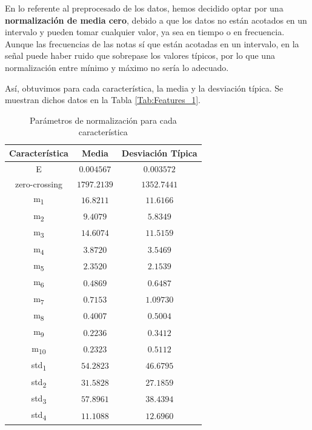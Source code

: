 \documentclass[12pt]{article}
\begin{document}
\bigskip
En lo referente al preprocesado de los datos, hemos decidido optar por una \textbf{normalización de media cero},
debido a que los datos no están acotados en un intervalo y pueden tomar cualquier valor, ya sea
en tiempo o en frecuencia.
Aunque las frecuencias de las notas sí que están acotadas en un intervalo, en la señal
puede haber ruido que sobrepase los valores típicos, por lo que una normalización entre mínimo y máximo no sería lo adecuado.

Así, obtuvimos para cada característica, la media y la desviación típica. Se muestran dichos datos en la Tabla \ref{Tab:Features_1}.

\newpage

\begin{table}[!ht]
	\caption{Parámetros de normalización para cada característica}
	\centering
		\begin{tabular}{||c c c||}
			\hline
			Característica & Media & Desviación Típica  \\ [0.5ex]
			\hline\hline
			E & $0.004567$ & $0.003572$ \\
			\hline
			zero-crossing & $1797.2139$ & $1352.7441$ \\
			\hline
			m\textsubscript{1} & $16.8211$ & $11.6166$ \\
			\hline
			m\textsubscript{2} & $9.4079$ & $5.8349$ \\
			\hline
			m\textsubscript{3} & $14.6074$ & $11.5159$ \\
			\hline
			m\textsubscript{4} & $3.8720$ & $3.5469$ \\
			\hline
			m\textsubscript{5} & $2.3520$ & $2.1539$ \\
			\hline
			m\textsubscript{6} & $0.4869$ & $0.6487$ \\
			\hline
			m\textsubscript{7} & $0.7153$ & $1.09730$ \\
			\hline
			m\textsubscript{8} & $0.4007$ & $0.5004$ \\
			\hline
			m\textsubscript{9} & $0.2236$ & $0.3412$ \\
			\hline
			m\textsubscript{10} & $0.2323$ & $0.5112$ \\
			\hline
			std\textsubscript{1} & $54.2823$ & $46.6795$ \\
			\hline
			std\textsubscript{2} & $31.5828$ & $27.1859$ \\
			\hline
			std\textsubscript{3} & $57.8961$ & $38.4394$ \\
			\hline
			std\textsubscript{4} & $11.1088$ & $12.6960$ \\

\end{tabular}
\end{table}
\end{document}
